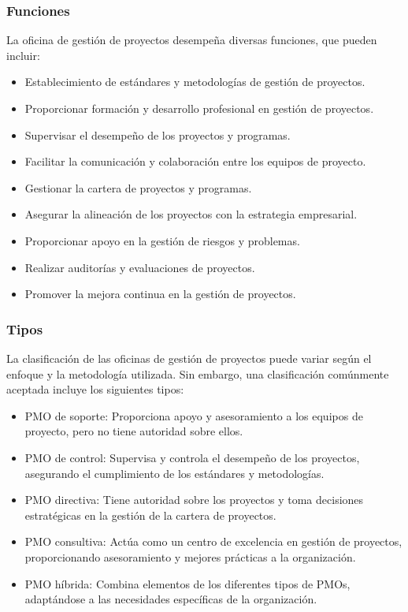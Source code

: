 \subsubsection{Funciones}
La oficina de gestión de proyectos desempeña diversas funciones, que pueden incluir:
\begin{itemize}
    \item Establecimiento de estándares y metodologías de gestión de proyectos.
    \item Proporcionar formación y desarrollo profesional en gestión de proyectos.
    \item Supervisar el desempeño de los proyectos y programas.
    \item Facilitar la comunicación y colaboración entre los equipos de proyecto.
    \item Gestionar la cartera de proyectos y programas.
    \item Asegurar la alineación de los proyectos con la estrategia empresarial.
    \item Proporcionar apoyo en la gestión de riesgos y problemas.
    \item Realizar auditorías y evaluaciones de proyectos.
    \item Promover la mejora continua en la gestión de proyectos.
\end{itemize}
\subsubsection{Tipos}
La clasificación de las oficinas de gestión de proyectos puede variar según el enfoque y la metodología utilizada. Sin embargo, una clasificación comúnmente aceptada incluye los siguientes tipos:
\begin{itemize}
    \item PMO de soporte: Proporciona apoyo y asesoramiento a los equipos de proyecto, pero no tiene autoridad sobre ellos.
    \item PMO de control: Supervisa y controla el desempeño de los proyectos, asegurando el cumplimiento de los estándares y metodologías.
    \item PMO directiva: Tiene autoridad sobre los proyectos y toma decisiones estratégicas en la gestión de la cartera de proyectos.
    \item PMO consultiva: Actúa como un centro de excelencia en gestión de proyectos, proporcionando asesoramiento y mejores prácticas a la organización.
    \item PMO híbrida: Combina elementos de los diferentes tipos de PMOs, adaptándose a las necesidades específicas de la organización.
\end{itemize}
